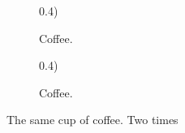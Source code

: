\documentclass{article}
\begin{document}
	\begin{figure}[hi]
		\centering
		\begin{subfigure}[b](0.4\linewidth)
			
		    \caption{Coffee.}
		\end{subfigure}	
	    \begin{subfigure}[b](0.4\linewidth)
	    	
	        \caption{Coffee.}
	    \end{subfigure}
    	\caption{The same cup of coffee. Two times}
    	\label{fig:coffee}
   \end{figure}
	
 		
\end{document}
